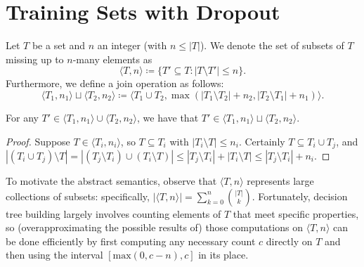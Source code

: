 \section{Training Sets with Dropout}\label{sec:domain}

\begin{definition}
Let $T$ be a set and $n$ an integer (with $n \leq |T|$).
We denote the set of subsets of $T$ missing up to $n$-many elements as
\[
\langle T, n \rangle \coloneqq
\{T' \subseteq T : |T \setminus T'| \leq n\} .
\]
Furthermore, we define a join operation as follows:
\[
\langle T_1, n_1 \rangle \sqcup \langle T_2, n_2 \rangle
\coloneqq \langle T_1 \cup T_2,
\max(|T_1 \setminus T_2| + n_2, |T_2 \setminus T_1| + n_1) \rangle .
\]
\end{definition}

\begin{proposition}
For any $T' \in \langle T_1, n_1 \rangle \cup \langle T_2, n_2 \rangle$,
we have that $T' \in \langle T_1, n_1 \rangle \sqcup \langle T_2, n_2 \rangle$.
\end{proposition}
\begin{proof}
Suppose $T \in \langle T_i, n_i \rangle$,
so $T \subseteq T_i$ with $|T_i \setminus T| \leq n_i$.
Certainly $T \subseteq T_i \cup T_j$,
and $|(T_i \cup T_j) \setminus T| = |(T_j \setminus T_i) \cup (T_i \setminus T)|
\leq |T_j \setminus T_i| + |T_i \setminus T| \leq |T_j \setminus T_i| + n_i$.
\end{proof}


To motivate the abstract semantics,
observe that $\langle T, n \rangle$ represents large collections of subsets:
specifically,
$|\langle T, n \rangle| = \sum_{k = 0}^n \binom{|T|}{k}$.
Fortunately, decision tree building largely involves counting elements of $T$
that meet specific properties,
so (overapproximating the possible results of) those computations
on $\langle T, n \rangle$ can be done efficiently by first computing
any necessary count $c$ directly on $T$ and then using the interval
$[\text{max}(0, c-n), c]$ in its place.
